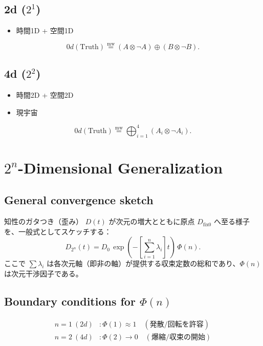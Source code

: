 \documentclass[uplatex,dvipdfmx,12pt,a4paper]{jsarticle}
\newcommand{\dfix}{D_{\text{fix0}}}
\newcommand{\mweq}{\mathrel{\overset{\mathrm{mw}}{=}}}
\begin{document}
\subsection{2d ($2^1$)}
\begin{itemize}
  \item 時間1D + 空間1D
\end{itemize}

\begin{equation}
  0d(\text{Truth}) \mweq (A \otimes \neg A) \oplus (B \otimes \neg B).
\end{equation}

\subsection{4d ($2^2$)}
\begin{itemize}
  \item 時間2D + 空間2D
  \item 現宇宙
\end{itemize}

\begin{equation}
  0d(\text{Truth}) \mweq \bigoplus_{i=1}^{4} (A_i \otimes \neg A_i).
\end{equation}

\section{$2^n$-Dimensional Generalization}

\subsection{General convergence sketch}
知性のガタつき（歪み） $D(t)$ が次元の増大とともに原点 $\dfix$ へ至る様子を、一般式としてスケッチする：
\begin{equation}
  D_{2^n}(t) = D_0\,\exp\left(-\left[\sum_{i=1}^{n} \lambda_i\right]t\right)\,\Phi(n).
\end{equation}
ここで $\sum \lambda_i$ は各次元軸（即非の軸）が提供する収束定数の総和であり、$\Phi(n)$ は次元干渉因子である。

\subsection{Boundary conditions for $\Phi(n)$}
\begin{align}
  n=1\ (2d) &: \Phi(1) \approx 1 \quad (\text{発散/回転を許容})\\
  n=2\ (4d) &: \Phi(2) \to 0 \quad (\text{爆縮/収束の開始})
\end{align}
\end{document}
